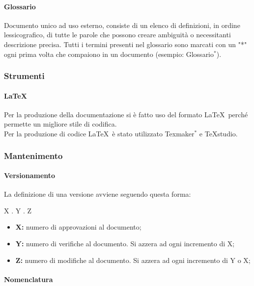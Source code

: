 \documentclass[11pt,a4paper]{article}
\begin{document}
{	\paragraph{Glossario\\}
	Documento unico ad uso esterno, consiste di un elenco di definizioni, in ordine lessicografico, di tutte le parole che possono creare ambiguità o necessitanti descrizione precisa. Tutti i termini presenti nel glossario sono marcati con un "*" ogni prima volta che compaiono in un documento (esempio: Glossario$^*$).
	
	\subsubsection{Strumenti}
	
	\paragraph{\LaTeX\\}
	 Per la produzione della documentazione si è fatto uso del formato \LaTeX\ perché permette un migliore stile di codifica.\\
	Per la produzione di codice \LaTeX\ è stato utilizzato Texmaker$^*$ e TeXstudio.
	
	\subsubsection{Mantenimento}
	
	\paragraph{Versionamento\\}
	La definizione di una versione avviene seguendo questa forma:
	\begin{center}
		X . Y . Z
	\end{center}
	
	\begin{itemize}
		\item \textbf{X:} numero di approvazioni al documento;
		\item \textbf{Y:} numero di verifiche al documento. Si azzera ad ogni incremento di X;
		\item \textbf{Z:} numero di modifiche al documento. Si azzera ad ogni incremento di Y o X;
	\end{itemize}
	
	
	
	\paragraph{Nomenclatura}
	
}
\end{document}
